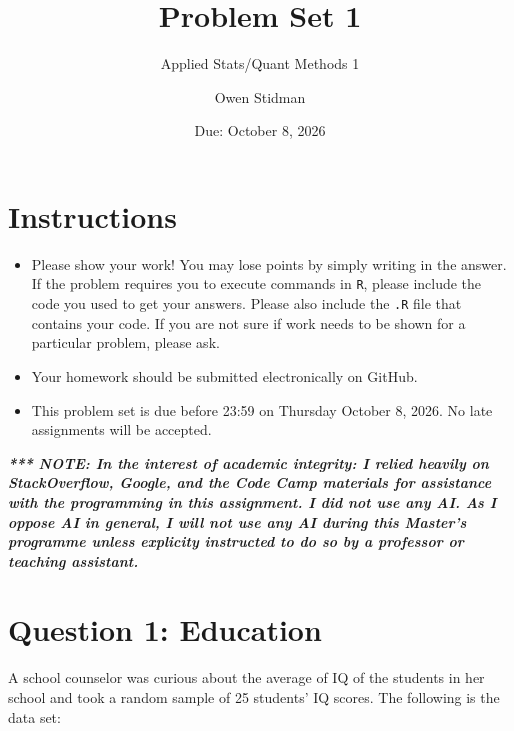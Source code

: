 \documentclass[12pt,letterpaper]{article}
\title{Problem Set 1}
\date{Due: October 8, 2026}
\author{Applied Stats/Quant Methods 1}
\author{Owen Stidman}
\begin{document}
	\maketitle
	
	\section*{Instructions}
	\begin{itemize}
		\item Please show your work! You may lose points by simply writing in the answer. If the problem requires you to execute commands in \texttt{R}, please include the code you used to get your answers. Please also include the \texttt{.R} file that contains your code. If you are not sure if work needs to be shown for a particular problem, please ask.
		\item Your homework should be submitted electronically on GitHub.
		\item This problem set is due before 23:59 on Thursday October 8, 2026. No late assignments will be accepted.
	\end{itemize}
	
	\vspace{1cm}
	
	\textbf{\textit{*** NOTE: In the interest of academic integrity: I relied heavily on StackOverflow, Google, and the Code Camp materials for assistance with the programming in this assignment. I did not use any AI. As I oppose AI in general, I will not use any AI during this Master's programme unless explicity instructed to do so by a professor or teaching assistant. }}
	
	\section*{Question 1: Education}
	
	A school counselor was curious about the average of IQ of the students in her school and took a random sample of 25 students' IQ scores. The following is the data set:\\
	\vspace{.5cm}
	
	  
	
	
	\vspace{1cm}
	
\end{document}
